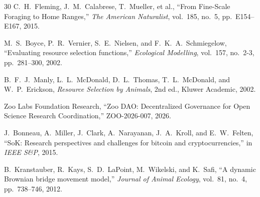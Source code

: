 \begin{thebibliography}{30}
C.~H.~Fleming, J.~M.~Calabrese, T.~Mueller, et al., ``From Fine-Scale Foraging to Home Ranges,'' \emph{The American Naturalist}, vol.~185, no.~5, pp.~E154--E167, 2015.

M.~S.~Boyce, P.~R.~Vernier, S.~E.~Nielsen, and F.~K.~A.~Schmiegelow, ``Evaluating resource selection functions,'' \emph{Ecological Modelling}, vol.~157, no.~2-3, pp.~281--300, 2002.

B.~F.~J.~Manly, L.~L.~McDonald, D.~L.~Thomas, T.~L.~McDonald, and W.~P.~Erickson, \emph{Resource Selection by Animals}, 2nd ed., Kluwer Academic, 2002.

Zoo Labs Foundation Research, ``Zoo DAO: Decentralized Governance for Open Science Research Coordination,'' ZOO-2026-007, 2026.

J.~Bonneau, A.~Miller, J.~Clark, A.~Narayanan, J.~A.~Kroll, and E.~W.~Felten, ``SoK: Research perspectives and challenges for bitcoin and cryptocurrencies,'' in \emph{IEEE S\&P}, 2015.

B.~Kranstauber, R.~Kays, S.~D.~LaPoint, M.~Wikelski, and K.~Safi, ``A dynamic Brownian bridge movement model,'' \emph{Journal of Animal Ecology}, vol.~81, no.~4, pp.~738--746, 2012.

\end{thebibliography}

